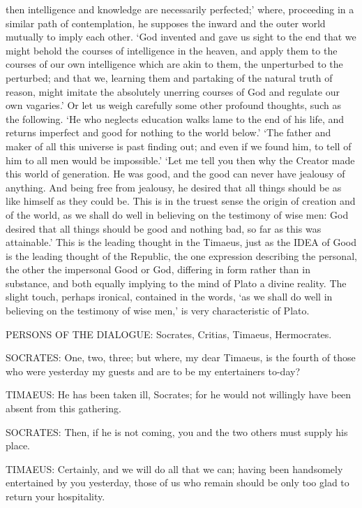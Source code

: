 then intelligence and knowledge are necessarily perfected;’ where,
proceeding in a similar path of contemplation, he supposes the inward and
the outer world mutually to imply each other. ‘God invented and gave us
sight to the end that we might behold the courses of intelligence in the
heaven, and apply them to the courses of our own intelligence which are
akin to them, the unperturbed to the perturbed; and that we, learning them
and partaking of the natural truth of reason, might imitate the absolutely
unerring courses of God and regulate our own vagaries.’ Or let us weigh
carefully some other profound thoughts, such as the following. ‘He who
neglects education walks lame to the end of his life, and returns
imperfect and good for nothing to the world below.’ ‘The father and maker
of all this universe is past finding out; and even if we found him, to
tell of him to all men would be impossible.’ ‘Let me tell you then why the
Creator made this world of generation. He was good, and the good can never
have jealousy of anything. And being free from jealousy, he desired that
all things should be as like himself as they could be. This is in the
truest sense the origin of creation and of the world, as we shall do well
in believing on the testimony of wise men: God desired that all things
should be good and nothing bad, so far as this was attainable.’ This is
the leading thought in the Timaeus, just as the IDEA of Good is the
leading thought of the Republic, the one expression describing the
personal, the other the impersonal Good or God, differing in form rather
than in substance, and both equally implying to the mind of Plato a divine
reality. The slight touch, perhaps ironical, contained in the words, ‘as
we shall do well in believing on the testimony of wise men,’ is very
characteristic of Plato.


PERSONS OF THE DIALOGUE: Socrates, Critias, Timaeus, Hermocrates.

SOCRATES: One, two, three; but where, my dear Timaeus, is the fourth of
those who were yesterday my guests and are to be my entertainers to-day?

TIMAEUS: He has been taken ill, Socrates; for he would not willingly have
been absent from this gathering.

SOCRATES: Then, if he is not coming, you and the two others must supply
his place.

TIMAEUS: Certainly, and we will do all that we can; having been handsomely
entertained by you yesterday, those of us who remain should be only too
glad to return your hospitality.

